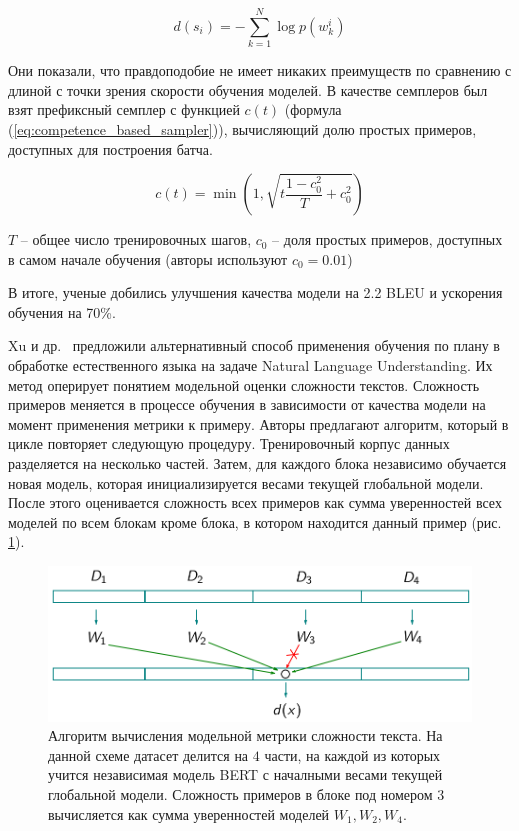 \documentclass{spbau-diploma}
\begin{document}
\begin{equation} \label{eq:log_likelihood}
d(s_i) = -\sum\limits_{k=1}^{N}\log p(w_k^i)
\end{equation}

Они показали, что правдоподобие не имеет никаких преимуществ по сравнению  с длиной с точки зрения скорости обучения моделей. В качестве семплеров был взят префиксный семплер с функцией $c(t)$ (формула (\ref{eq:competence_based_sampler})), вычисляющий долю простых примеров, доступных для построения батча.

\begin{equation} \label{eq:competence_based_sampler}
c(t) = \min\left(1, \sqrt{t\frac{1 - c_0^2}{T} + c_0^2}\right)
\end{equation}

$T$ -- общее число тренировочных шагов, $c_0$ -- доля простых примеров, доступных в самом начале обучения (авторы используют $c_0 = 0.01$)

В итоге, ученые добились улучшения качества модели на 2.2 BLEU и ускорения обучения на 70\%.

Xu и др.~\cite{xu2020curriculum} предложили альтернативный способ применения обучения по плану в обработке естественного языка на задаче Natural Language Understanding. Их метод оперирует понятием модельной оценки сложности текстов. Сложность примеров меняется в процессе обучения в зависимости от качества модели на момент применения метрики к примеру. Авторы предлагают алгоритм, который в цикле повторяет следующую процедуру. Тренировочный корпус данных разделяется на несколько частей. Затем, для каждого блока независимо обучается новая модель, которая инициализируется весами текущей глобальной модели. После этого оценивается сложность всех примеров как сумма уверенностей всех моделей по всем блокам кроме блока, в котором находится данный пример (рис. \ref{fig:acl20_algo_difficulty}).

\begin{figure}[h]
	\centering
	\includegraphics[scale=0.48]{acl20_algo_difficulty}
	\caption{Алгоритм вычисления модельной метрики сложности текста. На данной схеме датасет делится на $4$ части, на каждой из которых учится независимая модель BERT с началными весами текущей глобальной модели. Сложность примеров в блоке под номером $3$ вычисляется как сумма уверенностей моделей $W_1,W_2,W_4$.}
	\label{fig:acl20_algo_difficulty}
\end{figure}
\end{document}
